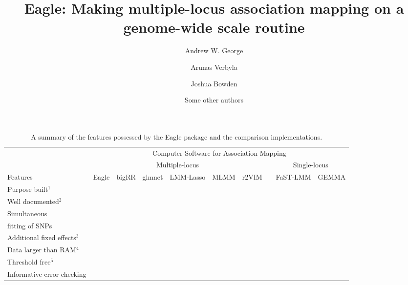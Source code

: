 \documentclass{article}
\newcommand{\cmark}{\ding{51}}%
\newcommand{\xmark}{\ding{55}}%
\begin{document}
\title{Eagle: Making multiple-locus association mapping on a genome-wide scale routine}
\author[1]{Andrew W. George}
\author[1]{Arunas Verbyla}
\author[2]{Joshua Bowden}
\author[1]{Some other authors}


\maketitle






\begin{table}
\label{suptabsummary}
\caption{A summary of the features possessed by the Eagle package and the comparison implementations.}
\begin{tabular}{lccccccccc}
                                &  \multicolumn{9}{c}{Computer Software for Association Mapping} \\ \cline{2-10}
                                 & \multicolumn{6}{c}{Multiple-locus}  & & \multicolumn{2}{c}{Single-locus} \\  \cline{2-7}   \cline{9-10}
 Features                 & Eagle  & bigRR & glmnet & LMM-Lasso & MLMM & r2VIM     & & FaST-LMM & GEMMA \\  \hline
Purpose built$^1$    &   \cmark     &    \cmark      &  \xmark   &  \cmark  &  \cmark  &  \cmark && \cmark & \cmark           \\ [0.2cm]
Well documented$^2$           & \cmark &   \xmark   & \cmark   & \xmark     &   \cmark     & \xmark          && \cmark    &    \cmark    \\  [0.2cm]
Simultaneous   &    \cmark     &    \cmark        &   \cmark          &      \cmark             &  \xmark          &  \xmark              &&   \xmark   &  \xmark     \\  
fitting of SNPs     &         &            &             &                   &            &                &&      &      \\  [0.2cm]
Additional fixed effects$^3$          &   \cmark   &      \cmark      &     \cmark    &  \xmark                 &      \cmark      &      \cmark          &&      \cmark & \cmark     \\   [0.2cm]
Data larger than RAM$^4$                   &   \cmark    &      \xmark      & \xmark          &  \xmark    &  \xmark    &   \xmark     && \cmark      & \xmark    \\  [0.2cm]
Threshold free$^5$        &    \cmark     &  \xmark    &  \xmark         &    \xmark               &     \cmark       &  \xmark              &&  \xmark   & \xmark      \\  [0.2cm]
Informative error checking           &  \cmark      &     \xmark        &      \xmark     &           \xmark        &      \xmark       &         \xmark       && \cmark  & \xmark \\ \hline


\end{tabular}
\end{table}
\end{document}
